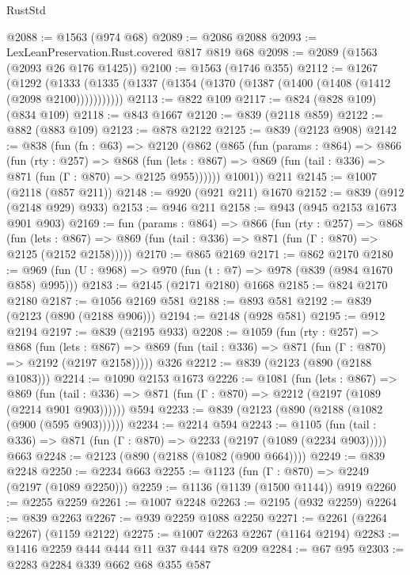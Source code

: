 \begin{lexlean}{RustStd}
\begin{coremodule}
{\begin{coremodule}
{{{{{{{{@2088 := @1563 (@974 @68)
@2089 := @2086 @2088
@2093 := LexLeanPreservation.Rust.covered @817 @819 @68
@2098 := @2089 (@1563 (@2093 @26 @176 @1425))
@2100 := @1563 (@1746 @355)
@2112 := @1267
    (@1292 (@1333 (@1335 (@1337 (@1354 (@1370 (@1387 (@1400 (@1408 (@1412 (@2098 @2100)))))))))))
@2113 := @822 @109
@2117 := @824 (@828 @109) (@834 @109)
@2118 := @843 @1667
@2120 := @839 (@2118 @859)
@2122 := @882 (@883 @109)
@2123 := @878 @2122
@2125 := @839 (@2123 @908)
@2142 := @838
    (fun (fn : @63) =>
    @2120
      (@862
        (@865
          (fun (params : @864) =>
          @866
            (fun (rty : @257) =>
            @868
              (fun (lets : @867) =>
              @869 (fun (tail : @336) => @871 (fun (Γ : @870) => @2125 @955))))))
        @1001))
    @211
@2145 := @1007 (@2118 (@857 @211))
@2148 := @920 (@921 @211) @1670
@2152 := @839 (@912 (@2148 @929) @933)
@2153 := @946 @211
@2158 := @943 (@945 @2153 @1673 @901 @903)
@2169 := fun (params : @864) =>
  @866
    (fun (rty : @257) =>
    @868
      (fun (lets : @867) =>
      @869 (fun (tail : @336) => @871 (fun (Γ : @870) => @2125 (@2152 @2158)))))
@2170 := @865 @2169
@2171 := @862 @2170
@2180 := @969 (fun (U : @968) => @970 (fun (t : @7) => @978 (@839 (@984 @1670 @858) @995)))
@2183 := @2145 (@2171 @2180) @1668
@2185 := @824 @2170 @2180
@2187 := @1056 @2169 @581
@2188 := @893 @581
@2192 := @839 (@2123 (@890 (@2188 @906)))
@2194 := @2148 (@928 @581)
@2195 := @912 @2194
@2197 := @839 (@2195 @933)
@2208 := @1059
    (fun (rty : @257) =>
    @868
      (fun (lets : @867) =>
      @869 (fun (tail : @336) => @871 (fun (Γ : @870) => @2192 (@2197 @2158)))))
    @326
@2212 := @839 (@2123 (@890 (@2188 @1083)))
@2214 := @1090 @2153 @1673
@2226 := @1081
    (fun (lets : @867) =>
    @869 (fun (tail : @336) => @871 (fun (Γ : @870) => @2212 (@2197 (@1089 (@2214 @901 @903))))))
    @594
@2233 := @839 (@2123 (@890 (@2188 (@1082 (@900 (@595 @903))))))
@2234 := @2214 @594
@2243 := @1105
    (fun (tail : @336) => @871 (fun (Γ : @870) => @2233 (@2197 (@1089 (@2234 @903)))))
    @663
@2248 := @2123 (@890 (@2188 (@1082 (@900 @664))))
@2249 := @839 @2248
@2250 := @2234 @663
@2255 := @1123 (fun (Γ : @870) => @2249 (@2197 (@1089 @2250)))
@2259 := @1136 (@1139 (@1500 @1144)) @919
@2260 := @2255 @2259
@2261 := @1007 @2248
@2263 := @2195 (@932 @2259)
@2264 := @839 @2263
@2267 := @939 @2259 @1088 @2250
@2271 := @2261 (@2264 @2267) (@1159 @2122)
@2275 := @1007 @2263 @2267 (@1164 @2194)
@2283 := @1416 @2259 @444 @444 @11 @37 @444 @78 @209
@2284 := @67 @95
@2303 := @2283
    @2284
    @339
    @662
    @68
    @355
    @587
}}}}}}}}
\end{coremodule}}
\end{coremodule}
\end{lexlean}
